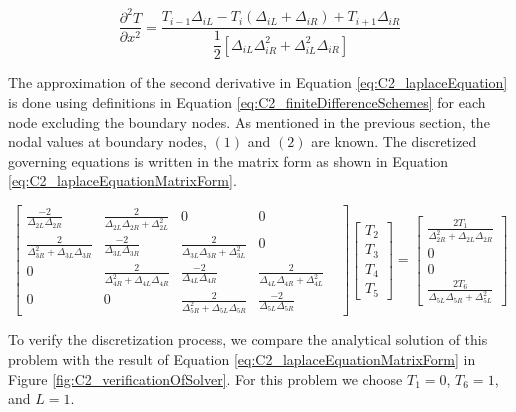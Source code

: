 \begin{equation}\label{eq:C2_finiteDifferenceSchemes}
	\frac{\partial^2 T}{\partial x^2} = 
	\frac{T_{i-1} \Delta_{iL} - 
	      T_{i} (\Delta_{iL} + \Delta_{iR}) + 
	      T_{i+1} \Delta_{iR}}
	     {\dfrac{1}{2} \left[ \Delta_{iL} \Delta_{iR}^2 + 
	                         \Delta_{iL}^2 \Delta_{iR} \right]}
\end{equation}

The approximation of the second derivative in Equation \eqref{eq:C2_laplaceEquation} is done using definitions in Equation \eqref{eq:C2_finiteDifferenceSchemes} for each node excluding the boundary nodes. As mentioned in the previous section, the nodal values at boundary nodes, $(1)$ and $(2)$ are known. The discretized governing equations is written in the matrix form as shown in Equation \eqref{eq:C2_laplaceEquationMatrixForm}.

\begin{equation}\label{eq:C2_laplaceEquationMatrixForm}
	\begin{bmatrix}
		\frac{-2}{\Delta_{2L} \Delta_{2R}} &
		\frac{2}{\Delta_{2L} \Delta_{2R} + \Delta_{2L}^2} &
		0 &
		0 &
		\\
		\frac{2}{\Delta_{3R}^2 + \Delta_{3L} \Delta_{3R}} & 
		\frac{-2}{\Delta_{3L} \Delta_{3R}} &
		\frac{2}{\Delta_{3L} \Delta_{3R} + \Delta_{3L}^2} &
		0
		\\
		0 &
		\frac{2}{\Delta_{4R}^2 + \Delta_{4L} \Delta_{4R}} & 
		\frac{-2}{\Delta_{4L} \Delta_{4R}} &
		\frac{2}{\Delta_{4L} \Delta_{4R} + \Delta_{4L}^2} &
		\\
		0 &
		0 &
		\frac{2}{\Delta_{5R}^2 + \Delta_{5L} \Delta_{5R}} & 
		\frac{-2}{\Delta_{5L} \Delta_{5R}}
	\end{bmatrix}
	\begin{bmatrix}
		T_2 \\
		T_3 \\
		T_4 \\
		T_5
	\end{bmatrix}
	=
	\begin{bmatrix}
		\frac{2T_1}{\Delta_{2R}^2 + \Delta_{2L} \Delta_{2R}} \\
		0 \\
		0 \\
		\frac{2T_6}{\Delta_{5L} \Delta_{5R} + \Delta_{5L}^2}
	\end{bmatrix}
\end{equation}

To verify the discretization process, we compare the analytical solution of this problem with the result of Equation \eqref{eq:C2_laplaceEquationMatrixForm} in Figure \ref{fig:C2_verificationOfSolver}. For this problem we choose $T_1 = 0$, $T_6 = 1$, and $L = 1$.

